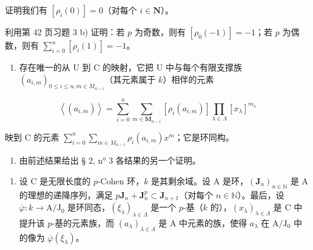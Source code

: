 证明我们有 \([\rho_i(0)] = 0\)（对每个 \(i \in \mathbf{N}\)）。

利用第 42 页习题 3 b) 证明：若 \(p\) 为奇数，则有 \([\rho_0(-1)] = -1\)；若 \(p\) 为偶数，则有 \(\sum_{i=0}^{n} [\rho_i(1)] = -1\)。

\begin{enumerate}
\def\labelenumi{\alph{enumi})}
\setcounter{enumi}{2}
\tightlist
\item
  存在唯一的从 U 到 C 的映射，它把 U 中与每个有限支撑族 \((a_{i,m})_{0\leqslant i\leqslant n,m\in M_{n - i}}\)（其元素属于 \(k\)）相伴的元素
\end{enumerate}

\[
\left\langle \left(a _ {i, m}\right) \right\rangle = \sum_ {i = 0} ^ {n} \sum_ {m \in \mathbf {M} _ {n - i}} \left[ \rho_ {i} (a _ {i, m}) \right] \prod_ {\lambda \in \Lambda} [ x _ {\lambda} ] ^ {m _ {\lambda}}
\]

映到 C 的元素 \(\sum_{i=0}^{n}\sum_{m\in M_{n-i}}\rho_i(a_{i,m})x^m\)；它是环同构。

\begin{enumerate}
\def\labelenumi{\alph{enumi})}
\setcounter{enumi}{3}
\tightlist
\item
  由前述结果给出 § 2, n° 3 各结果的另一个证明。
\end{enumerate}

\begin{enumerate}
\def\labelenumi{\arabic{enumi})}
\setcounter{enumi}{3}
\tightlist
\item
  设 C 是无限长度的 \(p\)-Cohen 环，\(k\) 是其剩余域。设 A 是环，\((\mathbf{J}_n)_{n \in \mathbb{N}}\) 是 A 的理想的递降序列，满足 \(p\mathbf{J}_n + \mathbf{J}_n^p \subset \mathbf{J}_{n+1}\)（对每个 \(n \in \mathbb{N}\)）。最后，设 \(\overline{\varphi}: k \to \mathrm{A} / \mathrm{J}_0\) 是环同态，\((\xi_\lambda)_{\lambda \in \Lambda}\) 是一个 \(p\)-基（\(k\) 的），\((x_\lambda)_{\lambda \in \Lambda}\) 是 C 中提升该 \(p\)-基的元素族，而 \((a_\lambda)_{\lambda \in \Lambda}\) 是 A 中元素的族，使得 \(a_\lambda\) 在 \(\mathrm{A} / \mathrm{J}_0\) 中的像为 \(\overline{\varphi}(\xi_\lambda)\)。
\end{enumerate}

